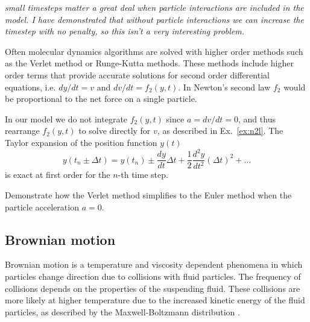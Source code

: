 \documentclass[twocolumn,preprintnumbers,amsmath,amssymb,aps,prx]{revtex4}
\begin{document}
  {\it small timesteps matter a great deal when particle interactions
    are included in the model.  I have demonstrated that
    without particle interactions we can increase the timestep
  with no penalty, so this isn't a very interesting problem.}


  Often molecular dynamics algorithms 
  are solved with higher order methods
  such as the Verlet method or Runge-Kutta methods.
  These methods include  higher order terms
  that provide accurate solutions for
  second order differential equations,
  i.e. $dy/dt = v$ and $dv/dt = f_2(y,t)$.
  In Newton's second law $f_2$ would be proportional
  to the net force on a single particle.

  In our model 
  we do not integrate $f_2(y,t)$ since 
  $a = dv/dt = 0$,
  and thus rearrange $f_2(y,t)$ to solve directly for $v$,
  as described in Ex.~\ref{ex:n2l}.
  The Taylor expansion of the position function $y(t)$
  \begin{equation}
    y(t_n \pm \Delta t) = y(t_n) \pm \frac{dy}{dt} \Delta t + \frac{1}{2} \frac{d^2y}{dt^2} (\Delta t)^2 + \ldots
  \end{equation}
  is exact at first order
  for the $n$-th time step.
  
  Demonstrate how the Verlet method
  simplifies to the Euler method when
  the particle acceleration $a=0$.



  \subsection{Brownian motion}
  \label{ex:brownian}
  Brownian motion 
  is a temperature and viscosity dependent
  phenomena in which 
  particles change direction %
  due to collisions with fluid particles.
  The frequency of collisions depends on the properties of
  the suspending fluid.
  These collisions are more likely at higher temperature
  due to the increased kinetic energy of the fluid particles,
  as described by the Maxwell-Boltzmann distribution \cite{Einstein1905}.
  
\end{document}
